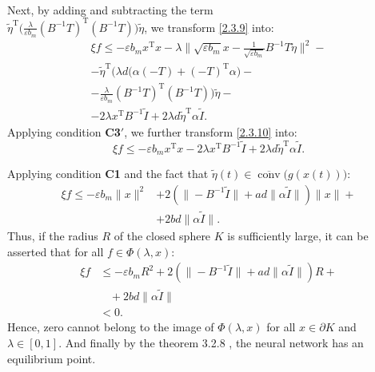 \documentclass[journal]{IEEEtran}
\begin{document}
\begin{IEEEproof}
\begin{equation}
\begin{aligned}
\end{aligned}
\end{equation}
Next, by adding and subtracting the term \\$\widetilde{\eta}^{\mathrm{T}}\big(\frac{\lambda}{\varepsilon b_m}(B^{-1}T)^{\mathrm{T}}(B^{-1}T)\big)\widetilde{\eta}$, we transform \eqref{2.3.9} into:  
\begin{multline}\label{2.3.10}
\xi f \leqslant  -\varepsilon b_m x^{\mathrm{T}}x -\lambda\bigg\|\sqrt{\varepsilon b_m} x - \frac{1}{\sqrt{\varepsilon b_m}} B^{-1}T \widetilde{\eta} \bigg\|^2-\\
- \widetilde{\eta}^{\mathrm{T}}\bigg( \lambda d \big(\alpha(-T)+(-T)^{\mathrm{T}}\alpha\big) - \\
-\frac{\lambda}{\varepsilon b_m}(B^{-1}T)^{\mathrm{T}}(B^{-1}T)\bigg) \widetilde{\eta} - \\
-2 \lambda x^\mathrm{T} B^{-1} \widetilde I + 2\lambda d \widetilde\eta^\mathrm{T} \alpha \widetilde I.
\end{multline}
Applying condition \textbf{C3$'$}, we further transform \eqref{2.3.10} into:  
\begin{equation*}\label{2.3.11}
\xi f \leqslant -\varepsilon b_m x^{\mathrm{T}} x - 2 \lambda x^{\mathrm{T}} B^{-1} \widetilde{I} + 2 \lambda d \widetilde{\eta}^\mathrm{T} \alpha  \widetilde{I}.
\end{equation*}

Applying condition \textbf{C1} and the fact that $\widetilde\eta(t) \in \overline{\operatorname{conv}}\big(g(x(t))\big)$:
\begin{equation*}\label{2.3.12}
\begin{aligned}
    \xi f   \leqslant -\varepsilon b_m\|x\|^2&+2\left(\|-B^{-1} \widetilde{I}\| + a d  \|\alpha \widetilde{I}\|\right)\|x\|+ \\ 
    &+2 bd  \|\alpha \widetilde{I}\|.   
\end{aligned} 
\end{equation*}
Thus, if the radius $R$ of the closed sphere $K$ is sufficiently large, it can be asserted that for all $f\in \varPhi(\lambda,x)$:
\begin{equation*}\label{2.3.13}
\begin{aligned}
\xi f  &\leqslant -\varepsilon b_m R^2+2\left(\|-B^{-1} \widetilde{I}\| + a d  \|\alpha \widetilde{I}\|\right)R+\\&~~~~+2 bd  \|\alpha \widetilde{I}\|\\&<0 .     
\end{aligned}
\end{equation*}
Hence, zero cannot belong to the image of $\varPhi(\lambda, x)$ for all $x \in \partial K$ and $\lambda \in [0,1]$. And finally by the theorem 3.2.8 \cite[p. 90]{p3}, the neural network has an equilibrium point.
\end{IEEEproof}
\end{document}
